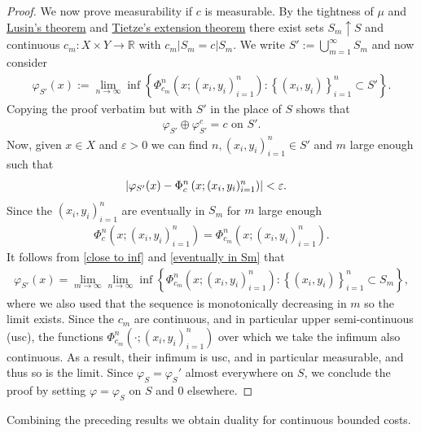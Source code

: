 \documentclass[
    a4paper,
    DIV=14,
    abstract=true,
    numbers=noenddot
]
{scrartcl}
\theoremstyle{definition}
\newenvironment{aligneq}{\begin{equation}\begin{aligned}}{\end{aligned}\end{equation}}
\newcommand{\eps}{\varepsilon}
\newcommand{\set}[1]{\left\{#1\right\}}
\newcommand\restr[2]{\left.#1\right|{#2}}
\newcommand{\R}{\mathbb{R}}
\begin{document}
\begin{proof}
    We now prove measurability if $c$ is measurable. By the tightness of $\mu $ and \href{https://en.wikipedia.org/wiki/Lusin%27s_theorem#:~:text=%5B1%5D-,General%20form,-%5Bedit%5D}{Lusin's theorem} and \href{https://en.wikipedia.org/wiki/Tietze_extension_theorem}{Tietze's extension theorem} there exist sets $S_m \uparrow S$ and continuous $c_m : X \times Y \to \R $ with $\restr{c_m}{S_m}=\restr{c}{S_m}$.   We write $S':= \bigcup_{m=1}^\infty S_m$ and now consider 
    \begin{align}\label{potential construction}
        \varphi_{S'}(x) := \lim_{n \to \infty}\inf\set{ \Phi^n_{c_m}\left(x;(x_i,y_i)_{i=1}^n\right): \set{(x_i,y_i)}_{i=1}^n \subset S'}.
    \end{align}
Copying the proof verbatim but with $S'$ in the place of $S$ shows that 
\begin{aligneq}\label{Sm construction}
    \varphi_{S'}\oplus \varphi_{S'}^c=c \text{ on }  S'.
\end{aligneq}
Now, given $x \in X$ and  $\eps >0$ we can find $n, (x_i,y_i)_{i=1}^n \in S'$ and $m$ large enough such that  
    \begin{align}\label{close to inf}
        \abs{\varphi_{S'}(x)-\Phi^n_{c}\left(x;(x_i,y_i)_{i=1}^n\right)}  & < \eps.
    \end{align}
    Since the $(x_i,y_i)_{i=1}^n $ are eventually in $S_m$ for $m$ large enough
    \begin{align}\label{eventually in Sm}
        \Phi^n_{c}\left(x;(x_i,y_i)_{i=1}^n\right)=\Phi^n_{c_m}\left(x;(x_i,y_i)_{i=1}^n\right).
    \end{align} 
It follows from \eqref{close to inf} and \eqref{eventually in Sm} that 
    \begin{align*}
        \varphi_{S'}(x) =\lim_{m \to \infty}\lim_{n \to \infty}\inf\set{ \Phi^n_{c_m}\left(x;(x_i,y_i)_{i=1}^n\right): \set{(x_i,y_i)}_{i=1}^n \subset S_m},
    \end{align*}
where we also used that the sequence is monotonically decreasing in $m$ so the limit exists.
    Since the $c_m$ are continuous, and in particular upper semi-continuous (usc), the functions $\Phi^n_{c_m}\left(\cdot ;(x_i,y_i)_{i=1}^n\right)$ over which we take the infimum also continuous. As a result, their infimum is usc, and in particular measurable, and thus so is the limit. Since $\varphi_S=\varphi_S'$ almost everywhere on $S$, we conclude the proof by setting $\varphi= \varphi_S$ on $S$ and $0$ elsewhere.
\end{proof}
Combining the preceding results we obtain duality for continuous bounded costs. 
\end{document}

